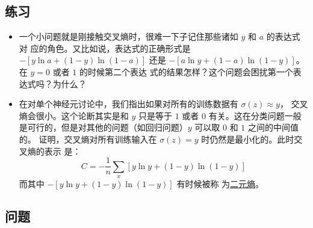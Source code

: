 \subsection*{练习}

\begin{itemize}
\item 一个小问题就是刚接触交叉熵时，很难一下子记住那些诸如 $y$ 和 $a$ 的表达式对
  应的角色。又比如说，表达式的正确形式是 $-[y \ln a + (1-y) \ln
  (1-a)]$ 还是 $-[a \ln y + (1-a) \ln (1-y)]$。在 $y=0$ 或者 $1$ 的时候第二个表达
  式的结果怎样？这个问题会困扰第一个表达式吗？为什么？
\item 在对单个神经元讨论中，我们指出如果对所有的训练数据有 $\sigma(z) \approx y$，
  交叉熵会很小。这个论断其实是和 $y$ 只是等于 $1$ 或者 $0$ 有关。这在分类问题一般
  是可行的，但是对其他的问题（如回归问题）$y$ 可以取 $0$ 和 $1$ 之间的中间值的。
  证明，交叉熵对所有训练输入在 $\sigma(z) = y$ 时仍然是最小化的。此时交叉熵的表示
  是：
  \begin{equation}
    C = -\frac{1}{n} \sum_x [y \ln y+(1-y) \ln(1-y)]
    \label{eq:64}\tag{64}
  \end{equation}
  而其中 $-[y \ln y+(1-y)\ln(1-y)]$ 有时候被称
  为\href{http://en.wikipedia.org/wiki/Binary_entropy_function}{二元熵}。
\end{itemize}

\subsection*{问题}

